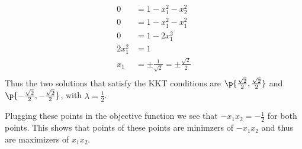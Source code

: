\documentclass[11pt, oneside]{article}
\begin{document}
\begin{enumerate}
    \begin{align*}
      0 &= 1 - x_1^2 - x_2^2 \\
      0 &= 1 - x_1^2 - x_1^2 \\
      0 &= 1 - 2x_1^2 \\
      2x_1^2 &= 1 \\
      x_1 &= \pm \frac{1}{\sqrt{2}} = \pm \frac{\sqrt{2}}{2} \\
    \end{align*}
    Thus the two solutions that satisfy the KKT conditions are
    $\p{\frac{\sqrt{2}}{2}, \frac{\sqrt{2}}{2}}$ and
    $\p{-\frac{\sqrt{2}}{2}, -\frac{\sqrt{2}}{2}}$, with
    $\lambda = \frac{1}{2}$.

    Plugging these points in the objective function we see that
    $-x_1 x_2 = -\frac{1}{2}$ for both points.
    This shows that points of these points are minimzers of $-x_1 x_2$ and thus
    are maximizers of $x_1 x_2$.
\end{enumerate}
\end{document}
